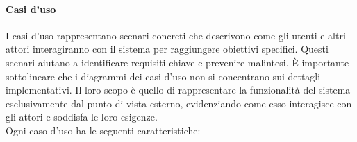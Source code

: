 \paragraph{Casi d'uso}
I casi d’uso rappresentano scenari concreti che descrivono come gli utenti e altri attori interagiranno con il sistema per raggiungere obiettivi specifici. Questi scenari aiutano a identificare requisiti chiave e prevenire malintesi. È importante sottolineare che i diagrammi dei casi d’uso non si concentrano sui dettagli implementativi. Il loro scopo è quello di rappresentare la funzionalità del sistema esclusivamente dal punto di vista esterno, evidenziando come esso interagisce con gli attori e soddisfa le loro esigenze.\\

\medskip Ogni caso d'uso ha le seguenti caratteristiche:

